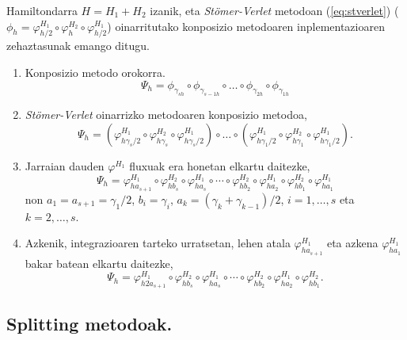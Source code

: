 Hamiltondarra $H=H_1+H_2$ izanik, eta \emph{Stömer-Verlet} metodoan (\ref{eq:stverlet}) ($\phi_h=\varphi_{h/2}^{H_1} \circ \varphi_{h}^{H_2} \circ \varphi_{h/2}^{H_1}$) oinarritutako konposizio metodoaren inplementazioaren zehaztasunak emango ditugu.
\begin{enumerate}
\item Konposizio metodo orokorra.
\begin{equation*}
\Psi_h =\phi_{\gamma_{s h}} \circ \phi_{\gamma_{s-1 h}} \circ \dots \circ \phi_{\gamma_{2 h}} \circ \phi_{\gamma_{1 h}}
\end{equation*}

\item \emph{Stömer-Verlet} oinarrizko metodoaren konposizio metodoa,
\begin{equation*}
\Psi_h =(\varphi_{h \gamma_s/2}^{H_1} \circ \varphi_{h \gamma_s}^{H_2} \circ \varphi_{h \gamma_s/2}^{H_1}) \circ \dots 
       \circ
       (\varphi_{h \gamma_1/2}^{H_1} \circ \varphi_{h \gamma_1}^{H_2} \circ \varphi_{h \gamma_1/2}^{H_1}).  
\end{equation*}

\item Jarraian dauden $\varphi^{H_1}$ fluxuak era honetan elkartu daitezke,
\begin{equation*}
\Psi_h=\varphi_{h a_{s+1}}^{H_1} \circ \varphi_{h b_s}^{H_2} \circ \varphi_{h a_s}^{H_1} \circ \cdots 
       \circ
       \varphi_{h b_2}^{H_2} 
       \circ
       \varphi_{h a_2}^{H_1} \circ \varphi_{h b_1}^{H_2} \circ \varphi_{h a_1}^{H_1}  
\end{equation*}
non $a_1=a_{s+1}=\gamma_1/2$, $b_i=\gamma_i$, $a_k=(\gamma_k+\gamma_{k-1})/2$, $i=1,\dots,s$ eta $k=2,\dots,s$.

\item Azkenik, integrazioaren tarteko urratsetan, lehen atala $\varphi_{h a_{s+1}}^{H_1}$ eta azkena $\varphi_{h a_1}^{H_1}$ bakar batean elkartu daitezke,
\begin{equation*}
\Psi_h=\varphi_{h 2 a_{s+1}}^{H_1} \circ \varphi_{h b_s}^{H_2} \circ \varphi_{h a_s}^{H_1} \circ \cdots 
\circ \varphi_{h b_2}^{H_2} 
\circ
\varphi_{h a_2}^{H_1} \circ \varphi_{h b_1}^{H_2}.
\end{equation*}

\end{enumerate}


\subsection{Splitting metodoak.}


